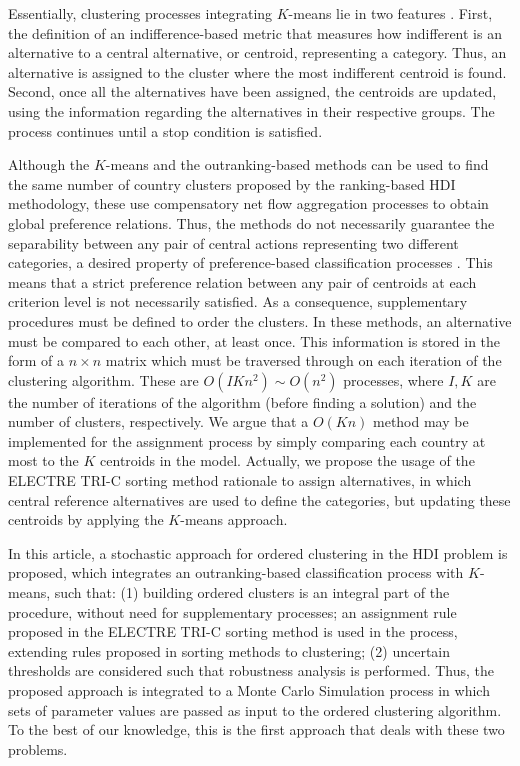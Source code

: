 \documentclass[]{elsarticle}
\theoremstyle{definition}
\begin{document}
Essentially, clustering processes integrating $K$-means lie in two features \citep{DeSmet2009,Lolli2014,Panapakidis2018, Chen2018}. First, the definition of  an indifference-based metric that measures how indifferent is an alternative to a central alternative, or centroid, representing a category. Thus, an alternative is assigned to the cluster where the most indifferent centroid is found. Second, once all the alternatives have been assigned, the centroids are updated, using the information regarding the alternatives in their respective groups.  The process continues until a stop condition is satisfied. 

Although the $K$-means and the outranking-based methods can be used to find the same number of country clusters proposed by the ranking-based HDI methodology, these use compensatory net flow aggregation processes to obtain global preference relations. Thus, the methods do not necessarily guarantee the separability between any pair of central actions representing two different categories, a desired property of preference-based classification processes \citep{roy2012}. This means that a strict preference relation between any pair of centroids at each criterion level is not necessarily satisfied. As a consequence, supplementary procedures must be defined to order the clusters.  In these methods,  an alternative must be compared to each other, at least once. This information is stored in the form of a $n \times n$ matrix which must be traversed through on each iteration of the clustering algorithm. These are $O(IKn^2) \sim O(n^2)$ processes, where $I, K$ are the number of iterations of the algorithm (before finding a solution) and the number of clusters, respectively. We argue that a $O(Kn)$ method may be implemented for the assignment process by simply comparing each country at most to the $K$ centroids in the model.  Actually, we propose the usage of the ELECTRE TRI-C sorting method rationale to assign alternatives, in which central reference alternatives are used to define the categories, but updating these centroids by applying the $K$-means approach.

In this article, a stochastic approach for ordered clustering in the HDI problem is proposed, which integrates an outranking-based classification process with $K$-means, such that:  (1) building ordered clusters is an integral part of the procedure, without need for supplementary processes; an assignment rule proposed in the ELECTRE TRI-C sorting method \citep{almeida2008,Almeida2012} is used in the process, extending rules proposed in sorting methods to clustering; (2) uncertain thresholds are considered such that robustness analysis is performed. Thus, the proposed approach is integrated  to a Monte Carlo Simulation process in which sets of  parameter values are passed as input to the ordered clustering algorithm. To the best of our knowledge, this is the first approach that deals with these two problems.
\end{document}
